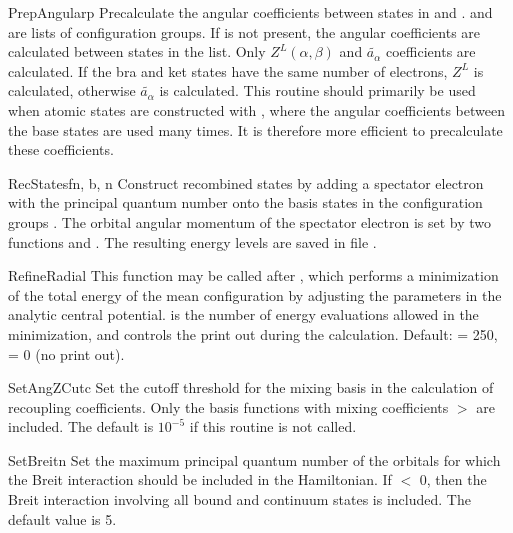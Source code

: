 \begin{fundesc}{PrepAngular}{p}
Precalculate the angular coefficients between states in  and
.  and  are lists of configuration groups. If  is
not present, the angular coefficients are calculated between states in the
 list. Only $Z^L(\alpha,\beta)$ and $\tilde{a_\alpha}$ coefficients are
calculated. If the bra and ket states have the same number of electrons, $Z^L$
is calculated, otherwise $\tilde{a_\alpha}$ is calculated. This routine should
primarily be used when atomic states are constructed with ,
where the angular coefficients between the base states are used many times. It
is therefore more efficient to precalculate these coefficients.
\end{fundesc}

\begin{fundesc}{RecStates}{fn, b, n}
Construct recombined states by adding a spectator electron with the principal
quantum number  onto the basis states in the configuration groups
. The orbital angular momentum of the spectator electron is set by two
functions  and . The resulting
energy levels are saved in file .
\end{fundesc}

\begin{fundesc}{RefineRadial}{}
This function may be called after , which performs a
minimization of the total energy of the mean configuration by adjusting the
parameters in the analytic central potential.  is the number of energy
evaluations allowed in the minimization, and  controls the print out
during the calculation. Default:  = 250,  = 0 (no print out).
\end{fundesc}

\begin{fundesc}{SetAngZCut}{c}
Set the cutoff threshold for the mixing basis in the calculation of recoupling
coefficients. Only the basis functions with mixing coefficients $>$ are
included. The default is $10^{-5}$ if this routine is not called.
\end{fundesc}

\begin{fundesc}{SetBreit}{n}
Set the maximum principal quantum number of the orbitals for which the
Breit interaction should be included in the Hamiltonian. If  $<$ 0,
then the Breit interaction involving all bound and continuum states is
included. The default value is 5.
\end{fundesc}

